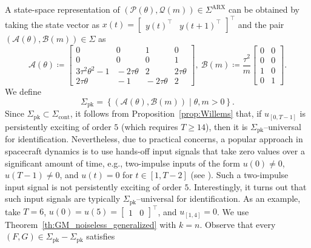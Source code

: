 \documentclass[journal,twoside,web]{ieeecolor}
\newcommand{\set}[2]{\left\{#1 \mid #2\right\}}
\begin{document}
A state-space representation of \mbox{$(\mathcal{P}(\theta),\mathcal{Q}(m))\in\Sigma^\text{ARX}$} can be obtained by taking the state vector as \mbox{$x(t)=\begin{bmatrix}
y(t)^\top &
y(t+1)^\top
\end{bmatrix}^\top$} and the pair $(\mathcal{A}(\theta),\mathcal{B}(m))\in\Sigma$ as
\begin{equation}
\mathcal{A}(\theta)\!\coloneqq\!\begin{bmatrix}
0 \!\!&\!\! 0 \!\!&\!\! 1 \!\!&\!\! 0 \\
0 \!\!&\!\! 0 \!\!&\!\! 0 \!\!&\!\! 1 \\
3\tau^2\theta^2\!-\!1 \!\!&\!\! -2\tau\theta \!\!&\!\! 2 \!\!&\!\! 2\tau\theta \\
2\tau\theta \!\!&\!\! -1 \!\!&\!\! -2\tau\theta \!\!&\!\! 2
\end{bmatrix}\!,\ \mathcal{B}(m)\!\coloneqq\!\frac{\tau^2}{m}\begin{bmatrix}
0 \!\!&\!\! 0 \\
0 \!\!&\!\! 0 \\
1 \!\!&\!\! 0 \\
0 \!\!&\!\! 1 
\end{bmatrix}\!.
\end{equation}
We define
\begin{equation}
\label{eq:Sigma_pk_ex1}
\Sigma_\text{pk}=\set{(\mathcal{A}(\theta),\mathcal{B}(m))}{\theta,m> 0}.
\end{equation}
Since $\Sigma_\text{pk}\subset\Sigma_\text{cont}$, it follows from Proposition~\ref{prop:Willems} that, if $u_{[0,T-1]}$ is persistently exciting of order $5$ (which requires $T\geq14$), then it is \mbox{$\Sigma_\text{pk}$--universal} for identification. Nevertheless, due to practical concerns, a popular approach in spacecraft dynamics is to use hands-off input signals that take zero values over a significant amount of time, e.g., two-impulse inputs of the form \mbox{$u(0)\neq 0$}, \mbox{$u(T-1)\neq 0$}, and $u(t)=0$ for \mbox{$t\in[1,T-2]$} (see \cite{prussing1970optimal}). Such a two-impulse input signal is not persistently exciting of order $5$. Interestingly, it turns out that such input signals are typically \mbox{$\Sigma_\text{pk}$--universal} for identification. As an example, take $T=6$, \mbox{$u(0)=u(5)=\begin{bmatrix}
1 & 0
\end{bmatrix}^\top$}, and \mbox{$u_{[1,4]}=0$}. We use Theorem~\ref{th:GM_noiseless_generalized} with $k=n$. Observe that every \mbox{$(F,G)\in\Sigma_\text{pk}-\Sigma_\text{pk}$} satisfies 
\end{document}
